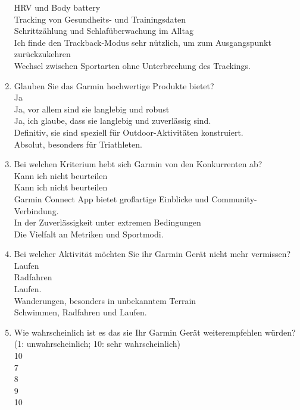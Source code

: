 \begin{enumerate}
    HRV und Body battery \\
    Tracking von Gesundheits- und Trainingsdaten \\
    Schrittzählung und Schlafüberwachung im Alltag \\
    Ich finde den Trackback-Modus sehr nützlich, um zum Ausgangspunkt zurückzukehren \\
    Wechsel zwischen Sportarten ohne Unterbrechung des Trackings.
    \item Glauben Sie das Garmin hochwertige Produkte bietet? \\
    Ja \\
    Ja, vor allem sind sie langlebig und robust \\
    Ja, ich glaube, dass sie langlebig und zuverlässig sind. \\
    Definitiv, sie sind speziell für Outdoor-Aktivitäten konstruiert. \\
    Absolut, besonders für Triathleten.
    \item Bei welchen Kriterium hebt sich Garmin von den Konkurrenten ab? \\
    Kann ich nicht beurteilen \\
    Kann ich nicht beurteilen \\
    Garmin Connect App bietet großartige Einblicke und Community-Verbindung. \\
    In der Zuverlässigkeit unter extremen Bedingungen \\
    Die Vielfalt an Metriken und Sportmodi.
    \item Bei welcher Aktivität möchten Sie ihr Garmin Gerät nicht mehr vermissen? \\
    Laufen \\
    Radfahren \\
    Laufen. \\
    Wanderungen, besonders in unbekanntem Terrain \\
    Schwimmen, Radfahren und Laufen.
    \item Wie wahrscheinlich ist es das sie Ihr Garmin Gerät weiterempfehlen würden? \\
    (1: unwahrscheinlich; 10: sehr wahrscheinlich) \\
    10 \\
    7 \\
    8 \\
    9 \\
    10
\end{enumerate}